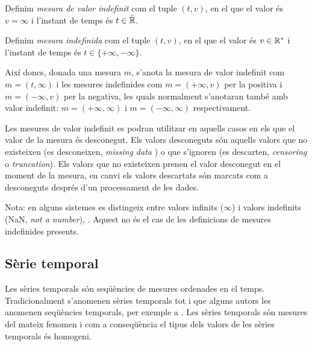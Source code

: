 \begin{definition}
  \label{def:model:mesura_valor_indefinit}
  Definim \emph{mesura de valor indefinit} com el tuple $(t,v)$, en el
  que el valor és $v=\infty$ i l'instant de temps és
  $t\in\bar{\mathbb{R}{}}$.
\end{definition}

\begin{definition}
  \label{def:model:mesura_indefinida}
  Definim \emph{mesura indefinida} com el tuple $(t,v)$, en el que el
  valor és $v\in\mathbb{R}{}^*$ i l'instant de temps és
  $t\in\{+\infty,-\infty\}$.
\end{definition}

Així doncs, donada una mesura $m$, s'anota la mesura de valor
indefinit com $m=(t,\infty)$ i les mesures indefinides com
$m=(+\infty,v)$ per la positiva i $m=(-\infty,v)$ per la negativa, les
quals normalment s'anotaran també amb valor indefinit:
$m=(+\infty,\infty)$ i $m=(-\infty,\infty)$ respectivament.


Les mesures de valor indefinit es podran utilitzar en aquells casos en
els que el valor de la mesura és desconegut. Els valors desconeguts
són aquells valors que no existeixen (es desconeixen, \emph{missing
  data} ) o que s'ignoren (es descarten, \emph{censoring} o
\emph{truncation}). Els valors que no existeixen prenen el valor
desconegut en el moment de la mesura, en canvi els valors descartats
són marcats com a desconeguts després d'un processament de les dades.

Nota: en alguns sistemes es distingeix entre valors infinits
($\infty$) i valors indefinits (NaN, \emph{not a number}),
\cite{wiki:ieee754}. Aquest no és el cas de les definicions de mesures
indefinides presents.







\subsection{Sèrie temporal}
\label{sec:model:serietemporal}

Les sèries temporals són seqüències de mesures ordenades en el temps.
Tradicionalment s'anomenen sèries temporals tot i que alguns autors les anomenen
seqüències temporals, per exemple a \cite{last:hetland}.  Les sèries
temporals són mesures del mateix fenomen i com a conseqüència el tipus
dels valors de les sèries temporals és homogeni.


